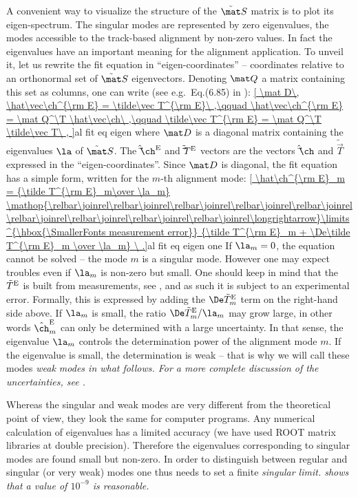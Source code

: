 A convenient way to visualize the structure of the $\tilde\mat S$ matrix is to plot its eigen-spectrum. The singular modes are represented by zero eigenvalues, the modes accessible to the track-based alignment by non-zero values. In fact the eigenvalues have an important meaning for the alignment application. To unveil it, let us rewrite the fit equation  in ``eigen-coordinates'' -- coordinates relative to an orthonormal set of $\tilde\mat S$ eigenvectors. Denoting $\mat Q$ a matrix containing this set as columns, one can write (see e.g.~Eq.(6.85) in ):
\eqref{
	\mat D\, \hat\vec\ch^{\rm E} = \tilde\vec T^{\rm E}\ ,\qquad
	\hat\vec\ch^{\rm E} = \mat Q^\T \hat\vec\ch\ ,\qquad
	\tilde\vec T^{\rm E} = \mat Q^\T \tilde\vec T\ ,
}{al fit eq eigen}
where $\mat D$ is a diagonal matrix containing the eigenvalues $\la$ of $\tilde\mat S$. The $\hat\vec\ch^{\rm E}$ and $\tilde\vec T^{\rm E}$ vectors are the vectors $\hat\vec\ch$ and $\tilde\vec T$ expressed in the ``eigen-coordinates''. Since $\mat D$ is diagonal, the fit equation has a simple form, written for the $m$-th alignment mode:
\eqref{
	\hat\ch^{\rm E}_m = {\tilde T^{\rm E}_m\over \la_m}
	\mathop{\relbar\joinrel\relbar\joinrel\relbar\joinrel\relbar\joinrel\relbar\joinrel\relbar\joinrel\relbar\joinrel\relbar\joinrel\relbar\joinrel\longrightarrow}\limits^{\hbox{\SmallerFonts measurement error}}
	{\tilde T^{\rm E}_m + \De\tilde T^{\rm E}_m \over \la_m}
\ .}{al fit eq eigen one}
If $\la_m = 0$, the equation cannot be solved -- the mode $m$ is a singular mode. However one may expect troubles even if $\la_m$ is non-zero but small. One should keep in mind that the $\tilde T^{\rm E}$ is built from measurements, see , and as such it is subject to an experimental error. Formally, this is expressed by adding the $\De\tilde T^{\rm E}_m$ term on the right-hand side above. If $\la_m$ is small, the ratio $\De\tilde T^{\rm E}_m/\la_m$ may grow large, in other words $\hat\ch^{\rm E}_m$ can only be determined with a large uncertainty. In that sense, the eigenvalue $\la_m$ controls the determination power of the alignment mode $m$. If the eigenvalue is small, the determination is weak -- that is why we will call these modes \em{weak modes} in what follows. For a more complete discussion of the uncertainties, see .

Whereas the singular and weak modes are very different from the theoretical point of view, they look the same for computer programs. Any numerical calculation of eigenvalues has a limited accuracy (we have used ROOT matrix libraries  at double precision). Therefore the eigenvalues corresponding to singular modes are found small but non-zero. In order to distinguish between regular and singular (or very weak) modes one thus needs to set a finite \em{singular limit}.  shows that a value of $10^{-9}$ is reasonable.

